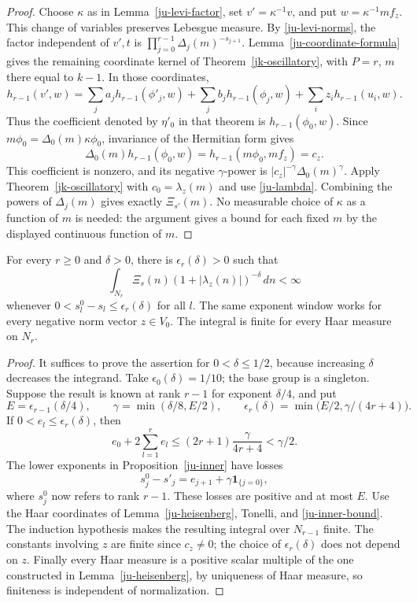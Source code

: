 \begin{proof}
Choose \(\kappa\) as in Lemma~\ref{ju-levi-factor}, set
\(v'=\kappa^{-1}v\), and put \(w=\kappa^{-1}mf_z\).
This change of variables preserves Lebesgue measure.
By \eqref{ju-levi-norms}, the factor independent of \(v',t\)
is \(\prod_{j=0}^{r-1}\Delta_j(m)^{-s_{j+1}}\).
Lemma~\ref{ju-coordinate-formula} gives the remaining
coordinate kernel of Theorem~\ref{jk-oscillatory}, with
\(P=r\), \(m\) there equal to \(k-1\).
In those coordinates,
\[
 h_{r-1}(v',w)=
 \sum_j a_j h_{r-1}(\phi'_j,w)
 +\sum_j b_j h_{r-1}(\phi_j,w)
 +\sum_i z_i h_{r-1}(u_i,w).
\]
Thus the coefficient denoted by \(\eta'_0\) in that theorem
is \(h_{r-1}(\phi_0,w)\).
Since \(m\phi_0=\Delta_0(m)\kappa\phi_0\), invariance of the
Hermitian form gives
\[
 \Delta_0(m)h_{r-1}(\phi_0,w)
            =h_{r-1}(m\phi_0,mf_z)=c_z .
\]
This coefficient is nonzero, and its negative \(\gamma\)-power
is \(|c_z|^{-\gamma}\Delta_0(m)^\gamma\).
Apply Theorem~\ref{jk-oscillatory} with \(c_0=\lambda_z(m)\)
and use \eqref{ju-lambda}.  Combining the powers of
\(\Delta_j(m)\) gives exactly \(\Xi_{s'}(m)\).
No measurable choice of \(\kappa\) as a function of \(m\)
is needed: the argument gives a bound for each fixed \(m\)
by the displayed continuous function of \(m\).
\end{proof}

\begin{theorem}\label{ju-integrability}
For every \(r\geq0\) and \(\delta>0\), there is
\(\epsilon_r(\delta)>0\) such that
\begin{equation}\label{ju-final}
 \int_{N_r}\Xi_s(n)(1+|\lambda_z(n)|)^{-\delta}\,dn<\infty
\end{equation}
whenever \(0<s_l^0-s_l\leq\epsilon_r(\delta)\) for all \(l\).
The same exponent window works for every negative norm vector
\(z\in V_0\).  The integral is finite for every Haar measure on
\(N_r\).
\end{theorem}

\begin{proof}
It suffices to prove the assertion for \(0<\delta\leq1/2\),
because increasing \(\delta\) decreases the integrand.
Take \(\epsilon_0(\delta)=1/10\); the base group is a singleton.
Suppose the result is known at rank \(r-1\) for exponent
\(\delta/4\), and put
\[
 E=\epsilon_{r-1}(\delta/4),\qquad
 \gamma=\min(\delta/8,E/2),\qquad
 \epsilon_r(\delta)=\min\bigl(E/2,\gamma/(4r+4)\bigr).
\]
If \(0<e_l\leq\epsilon_r(\delta)\), then
\[
 e_0+2\sum_{l=1}^{r}e_l
 \leq(2r+1)\frac{\gamma}{4r+4}<\gamma/2.
\]
The lower exponents in Proposition~\ref{ju-inner} have losses
\[
 s_j^0-s'_j=e_{j+1}+\gamma\mathbf1_{\{j=0\}},
\]
where \(s_j^0\) now refers to rank \(r-1\).
These losses are positive and at most \(E\).
Use the Haar coordinates of Lemma~\ref{ju-heisenberg},
Tonelli, and \eqref{ju-inner-bound}.  The induction hypothesis
makes the resulting integral over \(N_{r-1}\) finite.
The constants involving \(z\) are finite since \(c_z\ne0\);
the choice of \(\epsilon_r(\delta)\) does not depend on \(z\).
Finally every Haar measure is a positive scalar multiple of
the one constructed in Lemma~\ref{ju-heisenberg}, by uniqueness
of Haar measure, so finiteness is independent of normalization.
\end{proof}

